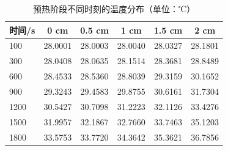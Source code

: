 \begin{table}[htbp]
\centering
\caption{预热阶段不同时刻的温度分布（单位：℃）}
\label{tab:t1}
\begin{tabular}{lccccc}
\toprule
时间/s & 0 cm & 0.5 cm & 1 cm & 1.5 cm & 2 cm \\
\midrule
100 & 28.0001 & 28.0003 & 28.0040 & 28.0327 & 28.1801 \\
300 & 28.0408 & 28.0635 & 28.1514 & 28.3681 & 28.8489 \\
600 & 28.4533 & 28.5360 & 28.8039 & 29.3159 & 30.1652 \\
900 & 29.3243 & 29.4583 & 29.8755 & 30.6161 & 31.7304 \\
1200 & 30.5427 & 30.7098 & 31.2223 & 32.1126 & 33.4276 \\
1500 & 31.9957 & 32.1867 & 32.7660 & 33.7463 & 35.1203 \\
1800 & 33.5753 & 33.7720 & 34.3642 & 35.3621 & 36.7856 \\
\bottomrule
\end{tabular}
\end{table}
